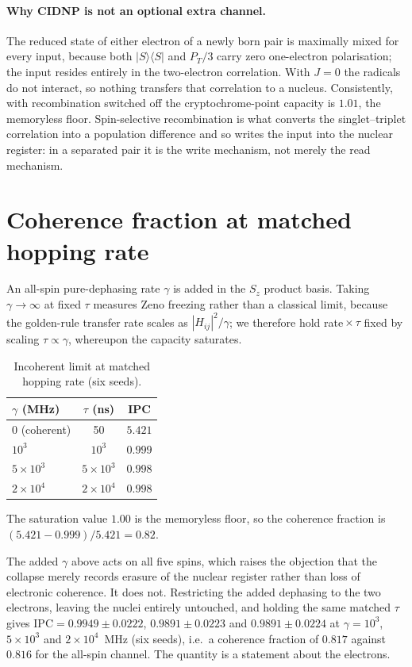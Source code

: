 \documentclass[aps,prx,reprint,superscriptaddress,nofootinbib,floatfix]{revtex4-2}
\begin{document}
\paragraph*{Why CIDNP is not an optional extra channel.} The reduced state of either
electron of a newly born pair is maximally mixed for every input, because both
$|S\rangle\langle S|$ and $P_T/3$ carry zero one-electron polarisation; the input
resides entirely in the two-electron correlation. With $J=0$ the radicals do not
interact, so nothing transfers that correlation to a nucleus. Consistently, with
recombination switched off the cryptochrome-point capacity is $1.01$, the memoryless
floor. Spin-selective recombination is what converts the singlet--triplet correlation
into a population difference and so writes the input into the nuclear register: in a
separated pair it is the write mechanism, not merely the read mechanism.

\section{Coherence fraction at matched hopping rate}
\label{sec:coh}
An all-spin pure-dephasing rate $\gamma$ is added in the $S_z$ product basis. Taking
$\gamma\to\infty$ at fixed $\tau$ measures Zeno freezing rather than a classical
limit, because the golden-rule transfer rate scales as $|H_{ij}|^2/\gamma$; we
therefore hold rate\,$\times\,\tau$ fixed by scaling $\tau\propto\gamma$, whereupon
the capacity saturates.

\begin{table}[H]
\caption{\label{tab:coh}Incoherent limit at matched hopping rate (six seeds).}
\begin{ruledtabular}
\begin{tabular}{lcc}
$\gamma$ (MHz) & $\tau$ (ns) & IPC \\
\hline
0 (coherent) & 50 & $5.421$ \\
$10^{3}$ & $10^{3}$ & $0.999$ \\
$5\times10^{3}$ & $5\times10^{3}$ & $0.998$ \\
$2\times10^{4}$ & $2\times10^{4}$ & $0.998$ \\
\end{tabular}
\end{ruledtabular}
\end{table}

The saturation value $1.00$ is the memoryless floor, so the coherence fraction is
$(5.421-0.999)/5.421=0.82$.

The added $\gamma$ above acts on all five spins, which raises the objection that
the collapse merely records erasure of the nuclear register rather than loss of
electronic coherence. It does not. Restricting the added dephasing to the two
electrons, leaving the nuclei entirely untouched, and holding the same matched
$\tau$ gives $\mathrm{IPC}=0.9949\pm0.0222$, $0.9891\pm0.0223$ and
$0.9891\pm0.0224$ at $\gamma=10^3$, $5\times10^3$ and $2\times10^4$~MHz (six
seeds), i.e.\ a coherence fraction of $0.817$ against $0.816$ for the all-spin
channel. The quantity is a statement about the electrons.
\end{document}
